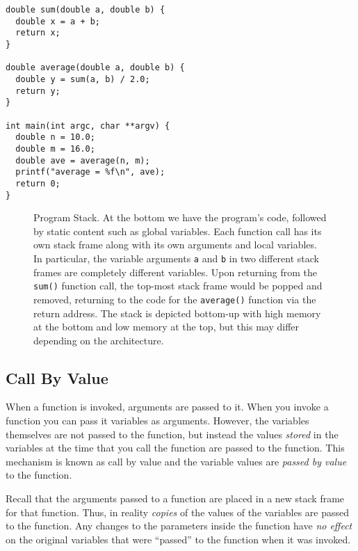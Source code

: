 \begin{verbatim}
double sum(double a, double b) {
  double x = a + b;
  return x;
}

double average(double a, double b) {
  double y = sum(a, b) / 2.0;
  return y;
}

int main(int argc, char **argv) {
  double n = 10.0;
  double m = 16.0;
  double ave = average(n, m);
  printf("average = %f\n", ave);
  return 0;
}
\end{verbatim}

\begin{figure}[!h]
\centering


\caption[Program Stack]{Program Stack.  At the bottom we have the program's code, followed by
static content such as global variables.  Each function call has its own stack frame along with
its own arguments and local variables.  In particular, the variable arguments \texttt{a} and
\texttt{b} in two different stack frames are completely different variables.  Upon returning
from the \texttt{sum()} function call, the top-most stack frame would be popped and removed, 
returning to the code for the \texttt{average()} function via the return address.
The stack is depicted bottom-up with high memory at the bottom and low memory at the
top, but this may differ depending on the architecture.}
\label{figure:programStack}
\end{figure}



\subsection{Call By Value}

When a function is invoked, arguments are passed to it.  When you
invoke a function you can pass it variables as arguments.  However, the
variables themselves are not passed to the function, but instead the
values \emph{stored} in the variables at the time that you call the
function are passed to the function.  This mechanism is known as 
\gls{call by value} and the variable values are \emph{passed by value}
to the function.

Recall that the arguments passed to a function are placed in a new
stack frame for that function.  Thus, in reality \emph{copies} of the
values of the variables are passed to the function.  Any changes to
the parameters inside the function have \emph{no effect} on the
original variables that were ``passed'' to the function when it was 
invoked.  

